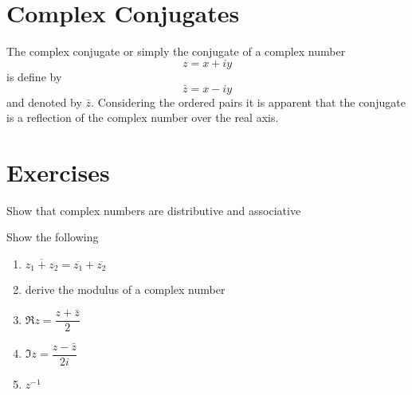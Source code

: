 \section{Complex Conjugates}
The complex conjugate or simply the conjugate of a complex number \[ z = x + iy \] is define by \[ \bar{z} = x - iy \] and denoted by $ \bar{z} $. Considering the ordered pairs it is apparent that the conjugate is a reflection of the complex number over the real axis. 

\section{Exercises}
\begin{exercise}
	Show that complex numbers are distributive and associative
\end{exercise}
\begin{exercise}
	Show the following
	\begin{enumerate}
		\item $ \overline{z_1 + z_2} = \overline{z_1} + \overline{z_2}$
		\item derive the modulus of a complex number 
		\item $ \Re z = \dfrac{z + \bar{z}}{2} $
		\item $ \Im z = \dfrac{z - \bar{z}}{2i} $
		\item $ z^{-1} $
	\end{enumerate}
\end{exercise}